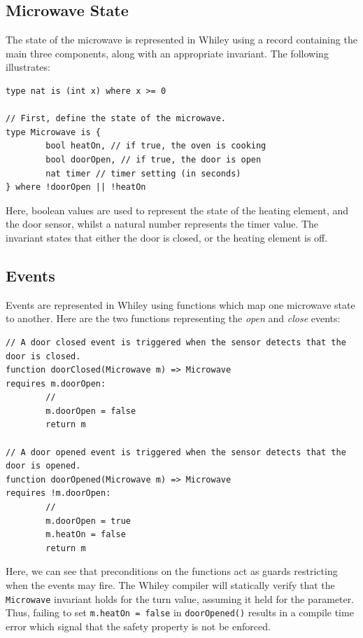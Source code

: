 \subsection{Microwave State}
The state of the microwave is represented in Whiley using a record containing the main three components, along with an appropriate invariant.  The following illustrates:

\begin{lstlisting}
type nat is (int x) where x >= 0

// First, define the state of the microwave.
type Microwave is {
        bool heatOn, // if true, the oven is cooking
        bool doorOpen, // if true, the door is open
        nat timer // timer setting (in seconds)
} where !doorOpen || !heatOn
\end{lstlisting}

Here, boolean values are used to represent the state of the heating element, and the door sensor, whilst a natural number represents the timer value.  The invariant states that either the door is closed, or the heating element is off.

\subsection{Events}

Events are represented in Whiley using functions which map one microwave state to another.  Here are the two functions representing the {\em open} and {\em close} events:
\begin{lstlisting}
// A door closed event is triggered when the sensor detects that the door is closed.
function doorClosed(Microwave m) => Microwave
requires m.doorOpen:
        //
        m.doorOpen = false
        return m

// A door opened event is triggered when the sensor detects that the door is opened.
function doorOpened(Microwave m) => Microwave
requires !m.doorOpen:
        //
        m.doorOpen = true
        m.heatOn = false
        return m
\end{lstlisting}

Here, we can see that preconditions on the functions act as guards restricting when the events may fire.  The Whiley compiler will statically verify that the \lstinline{Microwave} invariant holds for the turn value, assuming it held for the parameter.  Thus, failing to set \lstinline{m.heatOn = false} in \lstinline{doorOpened()} results in a compile time error which signal that the safety property is not be enforced.

